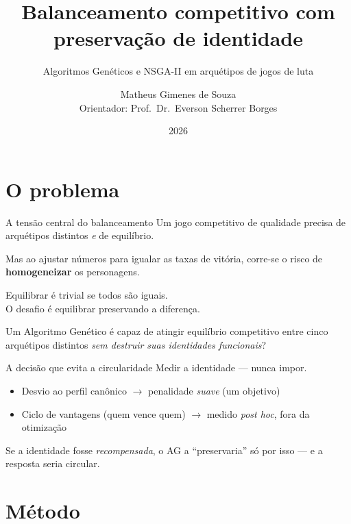 \documentclass[11pt,aspectratio=169]{beamer}
\title{Balanceamento competitivo com preservação de identidade}
\subtitle{Algoritmos Genéticos e NSGA-II em arquétipos de jogos de luta}
\author{Matheus Gimenes de Souza \\ \small Orientador: Prof.\ Dr.\ Everson Scherrer Borges}
\institute{Instituto Federal do Espírito Santo --- Campus Cachoeiro de Itapemirim}
\date{2026}
\begin{document}
\maketitle

\section{O problema}

\begin{frame}{A tensão central do balanceamento}
  Um jogo competitivo de qualidade precisa de \alert{arquétipos distintos}
  \emph{e} de \alert{equilíbrio}.

  \bigskip
  Mas ao ajustar números para igualar as taxas de vitória, corre-se o risco
  de \textbf{homogeneizar} os personagens.

  \vfill
  \begin{center}
    \Large
    Equilibrar é trivial se todos são iguais.\\
    O desafio é equilibrar \alert{preservando a diferença}.
  \end{center}
\end{frame}

\begin{frame}[standout]
  Um Algoritmo Genético é capaz de atingir equilíbrio competitivo entre
  cinco arquétipos distintos \emph{sem destruir suas identidades funcionais}?
\end{frame}

\begin{frame}{A decisão que evita a circularidade}
  \alert{Medir} a identidade --- nunca \alert{impor}.

  \bigskip
  \begin{itemize}
    \item Desvio ao perfil canônico $\rightarrow$ penalidade \emph{suave} (um objetivo)
    \item Ciclo de vantagens (quem vence quem) $\rightarrow$ medido \emph{post hoc}, fora da otimização
  \end{itemize}

  \vfill
  \footnotesize
  Se a identidade fosse \emph{recompensada}, o AG a ``preservaria'' só por isso ---
  e a resposta seria circular.
\end{frame}

\section{Método}
\end{document}

